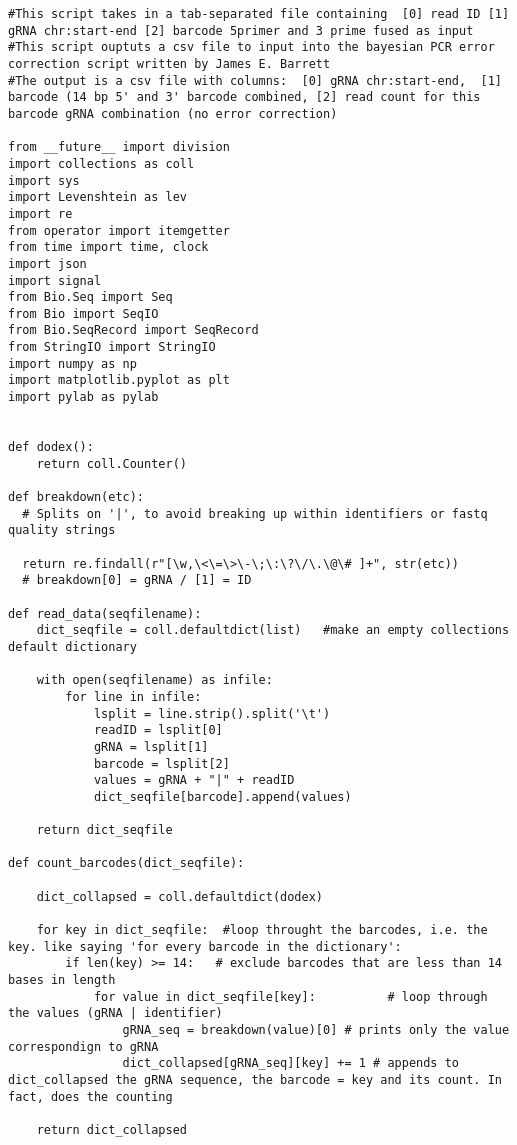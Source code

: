 \begin{footnotesize}
\begin{lstlisting}
#This script takes in a tab-separated file containing  [0] read ID [1] gRNA chr:start-end [2] barcode 5primer and 3 prime fused as input
#This script ouptuts a csv file to input into the bayesian PCR error correction script written by James E. Barrett
#The output is a csv file with columns:  [0] gRNA chr:start-end,  [1] barcode (14 bp 5' and 3' barcode combined, [2] read count for this barcode gRNA combination (no error correction)

from __future__ import division
import collections as coll
import sys
import Levenshtein as lev
import re
from operator import itemgetter
from time import time, clock
import json
import signal
from Bio.Seq import Seq
from Bio import SeqIO
from Bio.SeqRecord import SeqRecord
from StringIO import StringIO
import numpy as np
import matplotlib.pyplot as plt
import pylab as pylab


def dodex():
    return coll.Counter()

def breakdown(etc):
  # Splits on '|', to avoid breaking up within identifiers or fastq quality strings

  return re.findall(r"[\w,\<\=\>\-\;\:\?\/\.\@\# ]+", str(etc))
  # breakdown[0] = gRNA / [1] = ID

def read_data(seqfilename):
    dict_seqfile = coll.defaultdict(list)   #make an empty collections default dictionary

    with open(seqfilename) as infile:
        for line in infile:
            lsplit = line.strip().split('\t')
            readID = lsplit[0]
            gRNA = lsplit[1]
            barcode = lsplit[2]
            values = gRNA + "|" + readID
            dict_seqfile[barcode].append(values)

    return dict_seqfile

def count_barcodes(dict_seqfile):

    dict_collapsed = coll.defaultdict(dodex)

    for key in dict_seqfile:  #loop throught the barcodes, i.e. the key. like saying 'for every barcode in the dictionary':
        if len(key) >= 14:   # exclude barcodes that are less than 14 bases in length
            for value in dict_seqfile[key]:          # loop through the values (gRNA | identifier)
                gRNA_seq = breakdown(value)[0] # prints only the value correspondign to gRNA
                dict_collapsed[gRNA_seq][key] += 1 # appends to dict_collapsed the gRNA sequence, the barcode = key and its count. In fact, does the counting

    return dict_collapsed


\end{lstlisting}
\end{footnotesize}
